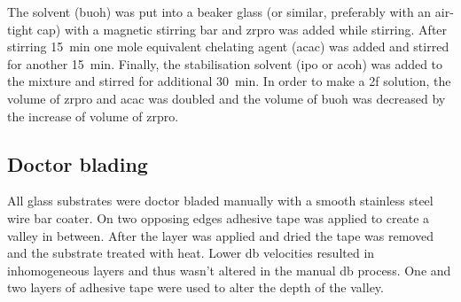 \documentclass[a4paper]{article}
\newcommand{\todo}[1]{\textbf{\textcolor{red}{#1}}}
\newcommand{\ds}[1]{}
\newcommand{\minutes}[1]{\SI{#1}{\minute}}
\begin{document}
The solvent (\gls{buoh}) was put into a beaker glass (or similar, preferably with an 
air-tight cap) with a magnetic stirring bar and \gls{zrpro} was added while stirring. After 
stirring \minutes{\ds{10 to }15} one mole equivalent chelating agent (\gls{acac}) was 
added and stirred for another \minutes{\ds{10 to }15}. Finally, the stabilisation 
solvent\cite{Hu2016} (\gls{ipo} or \gls{acoh}) was added to the mixture and stirred for 
additional \minutes{\ds{20-}30}. 
In order to make a \gls{2f} solution, the volume of \gls{zrpro} and \gls{acac} was 
doubled and the volume of \gls{buoh} was decreased by the increase of volume of \gls{zrpro}. 

\subsection{Doctor blading}
\label{sec:DB}
All glass substrates were doctor bladed manually with a smooth stainless steel wire bar 
coater. On two opposing edges adhesive tape was applied to create a valley in between. After the 
layer was applied and dried the tape was removed and the substrate treated with heat.
Lower \gls{db} velocities resulted in inhomogeneous layers and thus wasn't altered in the
manual \gls{db} process. 
One and two layers of adhesive tape were used to alter the depth of the valley. 
%
\end{document}
